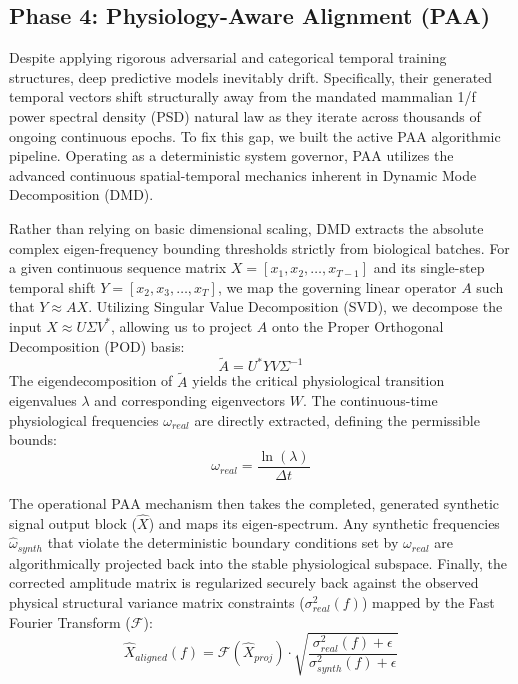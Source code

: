 \documentclass[journal,10pt,twocolumn]{IEEEtran}
\begin{document}
\subsection{Phase 4: Physiology-Aware Alignment (PAA)}
Despite applying rigorous adversarial and categorical temporal training structures, deep predictive models inevitably drift. Specifically, their generated temporal vectors shift structurally away from the mandated mammalian 1/f power spectral density (PSD) natural law as they iterate across thousands of ongoing continuous epochs. To fix this gap, we built the active PAA algorithmic pipeline. Operating as a deterministic system governor, PAA utilizes the advanced continuous spatial-temporal mechanics inherent in Dynamic Mode Decomposition (DMD). 

Rather than relying on basic dimensional scaling, DMD extracts the absolute complex eigen-frequency bounding thresholds strictly from biological batches. For a given continuous sequence matrix $X = [x_1, x_2, \dots, x_{T-1}]$ and its single-step temporal shift $Y = [x_2, x_3, \dots, x_T]$, we map the governing linear operator $A$ such that $Y \approx AX$. Utilizing Singular Value Decomposition (SVD), we decompose the input $X \approx U \Sigma V^*$, allowing us to project $A$ onto the Proper Orthogonal Decomposition (POD) basis:
\begin{equation}
    \tilde{A} = U^* Y V \Sigma^{-1}
\end{equation}
The eigendecomposition of $\tilde{A}$ yields the critical physiological transition eigenvalues $\lambda$ and corresponding eigenvectors $W$. The continuous-time physiological frequencies $\omega_{real}$ are directly extracted, defining the permissible bounds:
\begin{equation}
    \omega_{real} = \frac{\ln(\lambda)}{\Delta t}
\end{equation}

The operational PAA mechanism then takes the completed, generated synthetic signal output block ($\hat{X}$) and maps its eigen-spectrum. Any synthetic frequencies $\hat{\omega}_{synth}$ that violate the deterministic boundary conditions set by $\omega_{real}$ are algorithmically projected back into the stable physiological subspace. Finally, the corrected amplitude matrix is regularized securely back against the observed physical structural variance matrix constraints ($\sigma^2_{real}(f)$) mapped by the Fast Fourier Transform ($\mathcal{F}$):
\begin{equation}
    \hat{X}_{aligned} (f) = \mathcal{F}(\hat{X}_{proj}) \cdot \sqrt{\frac{\sigma^2_{real}(f) + \epsilon}{\sigma^2_{synth}(f) + \epsilon}}
\end{equation}
\end{document}

